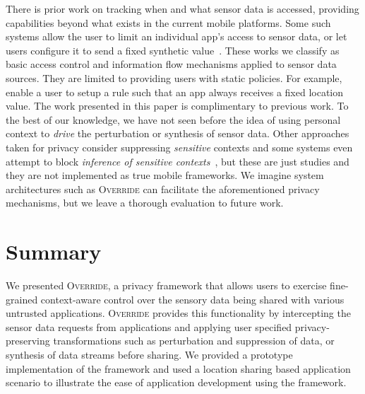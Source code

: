 \documentclass[10pt]{sensys-proc}
\begin{document}
There is prior work on tracking when and what sensor data is accessed, providing capabilities beyond what exists in the current mobile platforms. Some such systems allow the user to limit an individual app's access to sensor data, or let users configure it to send a fixed synthetic value~\cite{Beresford:MockDroid,Enck:TaintDroid}. These works we classify as basic access control and information flow mechanisms applied to sensor data sources. They are limited to providing users with static policies. For example, \cite{Beresford:MockDroid} enable a user to setup a rule such that an app always receives a fixed location value. The work presented in this paper is complimentary to previous work. To the best of our knowledge, we have not seen before the idea of using personal context to \emph{drive} the perturbation or synthesis of sensor data. Other approaches taken for privacy consider suppressing \emph{sensitive} contexts and some systems even attempt to block \emph{inference of sensitive contexts}~\cite{Gotz:MaskIt}, but these are just studies and they are not implemented as true mobile frameworks. We imagine system architectures such as \textsc{Override} can facilitate the aforementioned privacy mechanisms, but we leave a thorough evaluation to future work.

\section{Summary}
\label{Sec:conclusion}
We presented \textsc{Override}, a privacy framework that allows users to exercise fine-grained context-aware control over the sensory data being shared with various untrusted applications. \textsc{Override} provides this functionality by intercepting the sensor data requests from applications and applying user specified privacy-preserving transformations such as perturbation and suppression of data, or synthesis of data streams before sharing. We provided a prototype implementation of the framework and used a location sharing based application scenario to illustrate the ease of application development using the framework.

\balance


\end{document}
